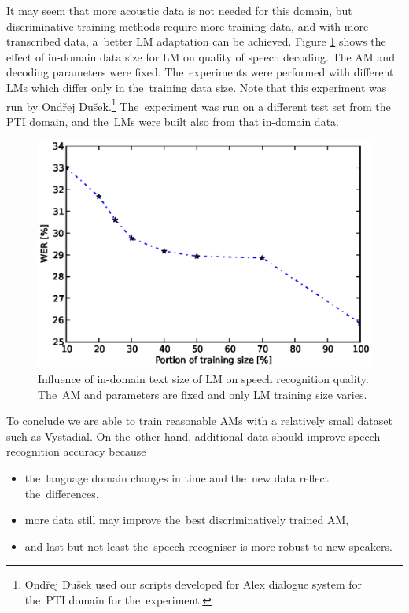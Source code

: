 It may seem that more acoustic data is not needed for this domain, but discriminative training methods require more training data, and with more transcribed data, a~better \ac{LM} adaptation can be achieved.
Figure \ref{fig:partials_lm} shows the effect of in-domain data size for \ac{LM} on quality of speech decoding.
The \ac{AM}  and decoding parameters were fixed.
The~experiments were performed with different \acp{LM} which differ only in the~training data size. 
Note that this experiment was run by Ondřej Dušek.\footnote{Ondřej Dušek used our scripts developed for Alex dialogue system for the~\ac{PTI} domain for the~experiment.}
The~experiment was run on a different test set from the \acf{PTI} domain, and the~\acp{LM} were built also from that in-domain data.

\begin{figure}[!htp]
    \begin{center}
    \includegraphics[scale=0.7]{images/partial-lm-tri2b-bmmi.ps}
    \caption{Influence of in-domain text size of \ac{LM} on speech recognition quality. The~\ac{AM}  and parameters are fixed and only \ac{LM} training size varies.}
    \label{fig:partials_lm} 
    \end{center}
\end{figure}

To conclude we are able to train reasonable \acp{AM} with a relatively small dataset such as Vystadial.
On the~other hand, additional data should improve speech recognition accuracy because
\begin{itemize}
    \item the~language domain changes in time and the~new data reflect the~differences,
    \item more data still may improve the~best discriminatively trained \ac{AM},
    \item and last but not least the~speech recogniser is more robust to new speakers.
\end{itemize}

